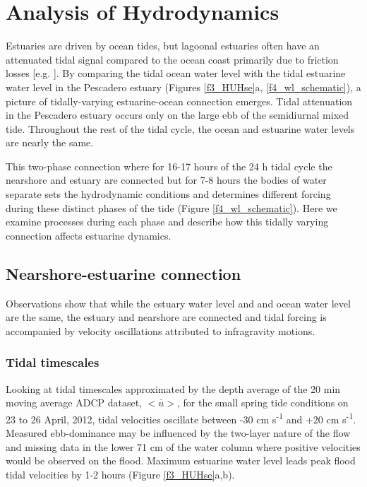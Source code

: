 \section{Analysis of Hydrodynamics}

Estuaries are driven by ocean tides, but lagoonal estuaries often
have an attenuated tidal signal compared to the ocean coast primarily
due to friction losses {[}e.g. \citealp{rydberg_and_wickbom_1996}{]}.
By comparing the tidal ocean water level with the tidal estuarine
water level in the Pescadero estuary (Figures \ref{f3_HUHse}a, \ref{f4_wl_schematic}),
a picture of tidally-varying estuarine-ocean connection emerges. Tidal
attenuation in the Pescadero estuary occurs only on the large ebb
of the semidiurnal mixed tide. Throughout the rest of the tidal cycle,
the ocean and estuarine water levels are nearly the same.

This two-phase connection where for 16-17 hours of the 24 h tidal
cycle the nearshore and estuary are connected but for 7-8 hours the
bodies of water separate sets the hydrodynamic conditions and determines
different forcing during these distinct phases of the tide (Figure
\ref{f4_wl_schematic}). Here we examine processes during each phase
and describe how this tidally varying connection affects estuarine
dynamics. 


\subsection{Nearshore-estuarine connection}

Observations show that while the estuary water level and and ocean
water level are the same, the estuary and nearshore are connected
and tidal forcing is accompanied by velocity oscillations attributed
to infragravity motions. 


\subsubsection{Tidal timescales}

Looking at tidal timescales approximated by the depth average of the
20 min moving average ADCP dataset, $\overline{<u>}$, for the small
spring tide conditions on 23 to 26 April, 2012, tidal velocities oscillate
between -30 cm s\textsuperscript{-1} and +20 cm s\textsuperscript{-1}.
Measured ebb-dominance may be influenced by the two-layer nature of
the flow and missing data in the lower 71 cm of the water column where
positive velocities would be observed on the flood. Maximum estuarine
water level leads peak flood tidal velocities by 1-2 hours (Figure
\ref{f3_HUHse}a,b). 



